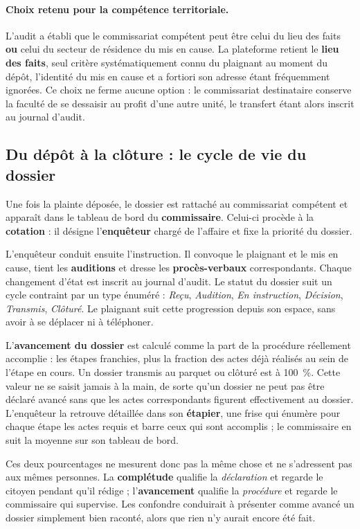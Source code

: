 \paragraph{Choix retenu pour la compétence territoriale.} L'audit a établi que le commissariat compétent peut être celui du lieu des faits \textbf{ou} celui du secteur de résidence du mis en cause. La plateforme retient le \textbf{lieu des faits}, seul critère systématiquement connu du plaignant au moment du dépôt, l'identité du mis en cause et a fortiori son adresse étant fréquemment ignorées. Ce choix ne ferme aucune option : le commissariat destinataire conserve la faculté de se dessaisir au profit d'une autre unité, le transfert étant alors inscrit au journal d'audit.

\subsection{Du dépôt à la clôture : le cycle de vie du dossier}

Une fois la plainte déposée, le dossier est rattaché au commissariat compétent et apparaît dans le tableau de bord du \textbf{commissaire}. Celui-ci procède à la \textbf{cotation} : il désigne l'\textbf{enquêteur} chargé de l'affaire et fixe la priorité du dossier.

L'enquêteur conduit ensuite l'instruction. Il convoque le plaignant et le mis en cause, tient les \textbf{auditions} et dresse les \textbf{procès-verbaux} correspondants. Chaque changement d'état est inscrit au journal d'audit. Le statut du dossier suit un cycle contraint par un type énuméré : \textit{Reçu}, \textit{Audition}, \textit{En instruction}, \textit{Décision}, \textit{Transmis}, \textit{Clôturé}. Le plaignant suit cette progression depuis son espace, sans avoir à se déplacer ni à téléphoner.

L'\textbf{avancement du dossier} est calculé comme la part de la procédure réellement accomplie : les étapes franchies, plus la fraction des actes déjà réalisés au sein de l'étape en cours. Un dossier transmis au parquet ou clôturé est à 100~\%. Cette valeur ne se saisit jamais à la main, de sorte qu'un dossier ne peut pas être déclaré avancé sans que les actes correspondants figurent effectivement au dossier. L'enquêteur la retrouve détaillée dans son \textbf{étapier}, une frise qui énumère pour chaque étape les actes requis et barre ceux qui sont accomplis ; le commissaire en suit la moyenne sur son tableau de bord.

Ces deux pourcentages ne mesurent donc pas la même chose et ne s'adressent pas aux mêmes personnes. La \textbf{complétude} qualifie la \textit{déclaration} et regarde le citoyen pendant qu'il rédige ; l'\textbf{avancement} qualifie la \textit{procédure} et regarde le commissaire qui supervise. Les confondre conduirait à présenter comme avancé un dossier simplement bien raconté, alors que rien n'y aurait encore été fait.


